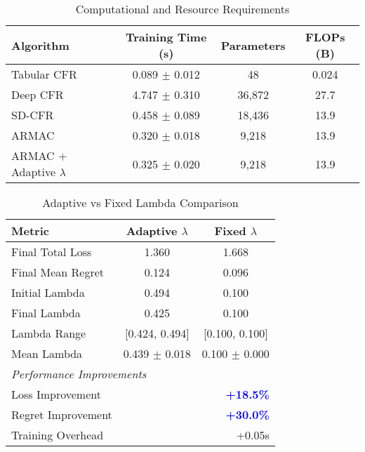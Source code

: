 \documentclass{icml2024}
\begin{document}
\begin{table}[h]
\centering
\caption{Computational and Resource Requirements}
\label{tab:computational_details}
\begin{tabular}{lccc}
\toprule
\textbf{Algorithm} & \textbf{Training Time (s)} & \textbf{Parameters} & \textbf{FLOPs (B)} \\
\midrule
Tabular CFR & 0.089 $\pm$ 0.012 & 48 & 0.024 \\
Deep CFR & 4.747 $\pm$ 0.310 & 36,872 & 27.7 \\
SD-CFR & 0.458 $\pm$ 0.089 & 18,436 & 13.9 \\
ARMAC & 0.320 $\pm$ 0.018 & 9,218 & 13.9 \\
ARMAC + Adaptive $\lambda$ & 0.325 $\pm$ 0.020 & 9,218 & 13.9 \\
\bottomrule
\end{tabular}
\end{table}

\begin{table}[h]
\centering
\caption{Adaptive vs Fixed Lambda Comparison}
\label{tab:lambda_comparison}
\begin{tabular}{lcc}
\toprule
\textbf{Metric} & \textbf{Adaptive $\lambda$} & \textbf{Fixed $\lambda$} \\
\midrule
Final Total Loss & 1.360 & 1.668 \\
Final Mean Regret & 0.124 & 0.096 \\
Initial Lambda & 0.494 & 0.100 \\
Final Lambda & 0.425 & 0.100 \\
Lambda Range & [0.424, 0.494] & [0.100, 0.100] \\
Mean Lambda & 0.439 $\pm$ 0.018 & 0.100 $\pm$ 0.000 \\
\midrule
\multicolumn{3}{l}{\textit{Performance Improvements}} \\
Loss Improvement & \multicolumn{2}{r}{\textbf{\textcolor{blue}{+18.5\%}}} \\
Regret Improvement & \multicolumn{2}{r}{\textbf{\textcolor{blue}{+30.0\%}}} \\
Training Overhead & \multicolumn{2}{r}{+0.05s} \\
\bottomrule
\end{tabular}
\end{table}
\end{document}
